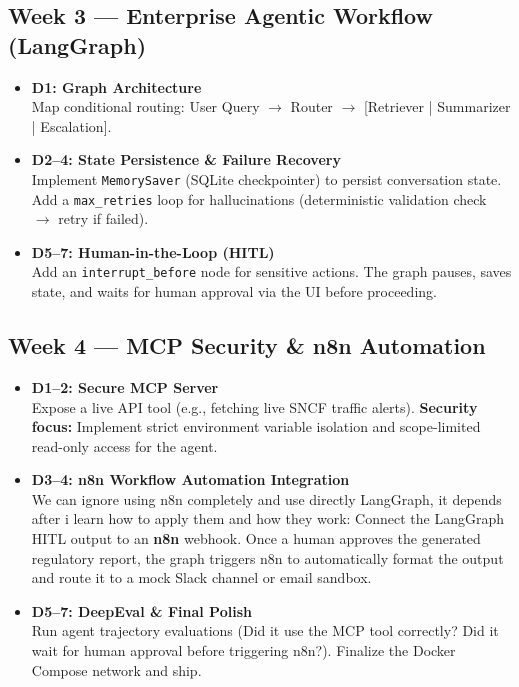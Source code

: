 \documentclass[11pt,a4paper]{article}
\begin{document}
\subsection*{Week 3 — Enterprise Agentic Workflow (LangGraph)}

\begin{tcolorbox}[systembox={ Step-by-Step: State, Recovery \& Approval}]
\begin{itemize}[leftmargin=*]
    \item \textbf{D1: Graph Architecture}\\
          Map conditional routing: User Query $\rightarrow$ Router $\rightarrow$ [Retriever | Summarizer | Escalation].
    \item \textbf{D2–4: State Persistence \& Failure Recovery}\\
          Implement \texttt{MemorySaver} (SQLite checkpointer) to persist conversation state. Add a \texttt{max\_retries} loop for hallucinations (deterministic validation check $\rightarrow$ retry if failed).
    \item \textbf{D5–7: Human-in-the-Loop (HITL)}\\
          Add an \texttt{interrupt\_before} node for sensitive actions. The graph pauses, saves state, and waits for human approval via the UI before proceeding.
\end{itemize}
\end{tcolorbox}

\subsection*{Week 4 — MCP Security \& n8n Automation}

\begin{tcolorbox}[systembox={ Step-by-Step: Secure Tools \& Workflows}]
\begin{itemize}[leftmargin=*]
    \item \textbf{D1–2: Secure MCP Server}\\
          Expose a live API tool (e.g., fetching live SNCF traffic alerts). \textbf{Security focus:} Implement strict environment variable isolation and scope-limited read-only access for the agent.
    \item \textbf{D3–4: n8n Workflow Automation Integration}\\
          We can ignore using n8n completely and use directly LangGraph, it depends after i learn how to apply them and how they work: Connect the LangGraph HITL output to an \textbf{n8n} webhook. Once a human approves the generated regulatory report, the graph triggers n8n to automatically format the output and route it to a mock Slack channel or email sandbox.
    \item \textbf{D5–7: DeepEval \& Final Polish}\\
          Run agent trajectory evaluations (Did it use the MCP tool correctly? Did it wait for human approval before triggering n8n?). Finalize the Docker Compose network and ship.
\end{itemize}
\end{tcolorbox}
\end{document}
